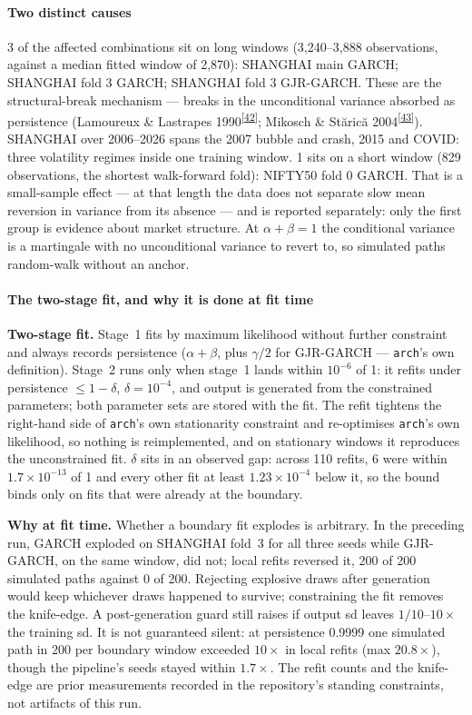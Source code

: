 \documentclass[11pt,a4paper]{article}
\makeatletter
\newcommand{\tcite}[1]{\textsuperscript{[\hyperlink{R:#1}{#1}]}}
\DeclareRobustCommand{\_}{\ifmmode\nfss@text{\textunderscore}\else\textunderscore\allowbreak\fi}
\makeatother
\begin{document}
\paragraph{Two distinct causes} 3 of the affected combinations sit on long windows (3,240--3,888 observations, against a median fitted window of 2,870): SHANGHAI main GARCH; SHANGHAI fold 3 GARCH; SHANGHAI fold 3 GJR-GARCH. These are the structural-break mechanism --- breaks in the unconditional variance absorbed as persistence (Lamoureux \& Lastrapes 1990\tcite{42}; Mikosch \& St\u{a}ric\u{a} 2004\tcite{43}). SHANGHAI over 2006--2026 spans the 2007 bubble and crash, 2015 and COVID: three volatility regimes inside one training window. 1 sits on a short window (829 observations, the shortest walk-forward fold): NIFTY50 fold 0 GARCH. That is a small-sample effect --- at that length the data does not separate slow mean reversion in variance from its absence --- and is reported separately: only the first group is evidence about market structure. At $\alpha+\beta=1$ the conditional variance is a martingale with no unconditional variance to revert to, so simulated paths random-walk without an anchor.

\paragraph{The two-stage fit, and why it is done at fit time} \textbf{Two-stage fit.} Stage~1 fits by maximum likelihood without further constraint and always records persistence ($\alpha+\beta$, plus $\gamma/2$ for GJR-GARCH --- \texttt{arch}'s own definition). Stage~2 runs only when stage~1 lands within $10^{-6}$ of 1: it refits under persistence $\le 1-\delta$, $\delta=10^{-4}$, and output is generated from the constrained parameters; both parameter sets are stored with the fit. The refit tightens the right-hand side of \texttt{arch}'s own stationarity constraint and re-optimises \texttt{arch}'s own likelihood, so nothing is reimplemented, and on stationary windows it reproduces the unconstrained fit. $\delta$ sits in an observed gap: across 110 refits, 6 were within $1.7\times10^{-13}$ of 1 and every other fit at least $1.23\times10^{-4}$ below it, so the bound binds only on fits that were already at the boundary.

\smallskip
\textbf{Why at fit time.} Whether a boundary fit explodes is arbitrary. In the preceding run, GARCH exploded on SHANGHAI fold~3 for all three seeds while GJR-GARCH, on the same window, did not; local refits reversed it, 200 of 200 simulated paths against 0 of 200. Rejecting explosive draws after generation would keep whichever draws happened to survive; constraining the fit removes the knife-edge. A post-generation guard still raises if output sd leaves $1/10$--$10\times$ the training sd. It is not guaranteed silent: at persistence 0.9999 one simulated path in 200 per boundary window exceeded $10\times$ in local refits (max $20.8\times$), though the pipeline's seeds stayed within $1.7\times$. The refit counts and the knife-edge are prior measurements recorded in the repository's standing constraints, not artifacts of this run.
\end{document}
